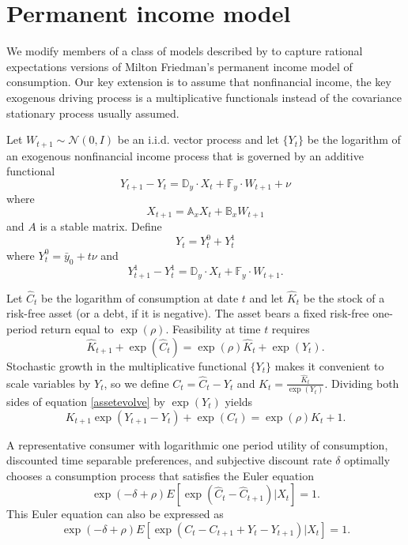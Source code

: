 \documentclass[12pt]{article}
\begin{document}
\newpage

\section{Permanent income model}

We modify   members of a class of models described by \citet[ch.~11]{HansenSargent_Recursive_Models} to capture rational expectations  versions of Milton Friedman's permanent income model of consumption.  Our key extension is to assume that nonfinancial income, 
the key exogenous driving process  is a multiplicative functionals instead of the 
covariance stationary process usually assumed.

 Let $W_{t+1} \sim {\mathcal N}(0, I)$ be an i.i.d. vector process and let  $\{Y_t\}$ be the logarithm of an exogenous nonfinancial income process that is governed by an additive functional
\[
Y_{t+1} - Y_t = {\mathbb D}_y \cdot X_t + {\mathbb F} _y\cdot W_{t+1} + \nu
\]
where
\[
X_{t+1} = {\mathbb A}_x X_t + {\mathbb B}_x W_{t+1}
\]
and $A$ is a stable matrix.  Define
\[ Y_t = Y_t^0 + Y_t^1 \]
where
 $Y_t^0 = {\bar y}_0 + t \nu$ and
\[
Y_{t+1}^1 - Y_t^1 = {\mathbb D}_y \cdot X_t + {\mathbb F}_y \cdot W_{t+1}.
\]




Let  ${\widehat C}_{t}$ be the logarithm of consumption at date $t$ and let ${\widehat K}_t$ be the stock of a risk-free asset (or a debt, if it is negative).
  The  asset bears a fixed  risk-free one-period return equal to   $ \exp(\rho)  $.
  Feasibility at time $t$ requires 
\begin{equation}\label{assetevolve}
{\widehat K}_{t+1} + \exp\left({\widehat C}_{t} \right) = \exp(\rho)  {\widehat K}_t + \exp(Y_{t}) .
\end{equation}
Stochastic growth in the multiplicative functional  $\{ Y_t\}$ makes it convenient  to scale variables by  $Y_t$, so we define $C_t = {\widehat C}_t - Y_t$ and $K_{t} = {\frac {{\widehat K}_{t}} {\exp(Y_{t})}}$.
Dividing   both sides of equation \eqref{assetevolve} by $\exp(Y_t)$ yields
\begin{equation}\label{eqn:pi1}
K_{t+1} \exp \left(Y_{t+1} - Y_t \right) + \exp\left( C_{t}\right) = \exp(\rho) {K}_t + 1.
\end{equation}

A representative consumer with  logarithmic one period utility of consumption, discounted  time separable preferences,  and subjective discount rate  $\delta$ optimally chooses a  consumption process that
satisfies  the Euler equation
\[
\exp(-\delta + \rho)  E\left[ \exp( {\widehat C}_t - {\widehat C}_{t+1} ) \vert X_t\right] = 1 .
\]
This Euler equation can also be expressed as
\[
\exp(-\delta + \rho)  E\left[ \exp( { C}_t - { C}_{t+1} + Y_t - Y_{t+1} ) \vert X_t\right] = 1 .
\]
\end{document}
